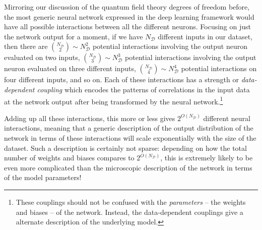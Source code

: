 \documentclass[12pt]{article}
\begin{document}
Mirroring our discussion of the quantum field theory degrees of freedom before, the most generic neural network expressed in the deep learning framework would have all possible interactions between all the different neurons. Focusing  on just the network output for a moment, if we have $N_\mathcal{D}$ different inputs in our dataset,  then there are $\binom{N_{\mathcal{D}}}{2}\sim N_\mathcal{D}^2$ potential interactions involving the output neuron evaluated on two inputs, $\binom{N_{\mathcal{D}}}{3}\sim N_\mathcal{D}^3$ potential interactions involving the output neuron evaluated on three different inputs, $\binom{N_{\mathcal{D}}}{4}\sim N_\mathcal{D}^4$ potential interactions on four different inputs, and so on. Each of these interactions has a strength or \emph{data-dependent coupling} which encodes the patterns of correlations in the input data at the network output after being transformed by the neural network.\footnote{
    These couplings should not be confused with the \emph{parameters} -- the weights and biases -- of the network. Instead, the data-dependent couplings give a alternate description of the underlying model.
}

Adding up all these interactions, this more or less gives $2^{O(N_\mathcal{D})}$ different neural interactions, meaning that a generic description of the output distribution of the network in terms of these interactions will scale exponentially with the size of the dataset. Such a description is certainly not sparse: depending on how the total number of weights and biases compares to $2^{O(N_\mathcal{D})}$, this is extremely likely to be even more complicated than the microscopic description of the network in terms of the model parameters!
\end{document}
